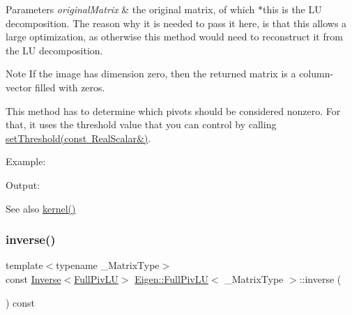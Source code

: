 \begin{DoxyParams}{Parameters}
{\em original\+Matrix} & the original matrix, of which $\ast$this is the LU decomposition. The reason why it is needed to pass it here, is that this allows a large optimization, as otherwise this method would need to reconstruct it from the LU decomposition.\\
\hline
\end{DoxyParams}
\begin{DoxyNote}{Note}
If the image has dimension zero, then the returned matrix is a column-\/vector filled with zeros.

This method has to determine which pivots should be considered nonzero. For that, it uses the threshold value that you can control by calling \mbox{\hyperlink{class_eigen_1_1_full_piv_l_u_a414592d82de98f5bd075965caf56d681}{set\+Threshold(const Real\+Scalar\&)}}.
\end{DoxyNote}
Example\+: 
\begin{DoxyCodeInclude}{0}
\end{DoxyCodeInclude}
 Output\+: 
\begin{DoxyVerbInclude}
\end{DoxyVerbInclude}


\begin{DoxySeeAlso}{See also}
\mbox{\hyperlink{class_eigen_1_1_full_piv_l_u_a70f52eeb2cd07dfbf790fce106fb4015}{kernel()}} 
\end{DoxySeeAlso}
\mbox{\label{class_eigen_1_1_full_piv_l_u_ae6f4bb55f859f6353f99cf15ecff4b25}} 
\subsubsection{\texorpdfstring{inverse()}{inverse()}}
{\footnotesize\ttfamily template$<$typename \+\_\+\+Matrix\+Type$>$ \\
const \mbox{\hyperlink{class_eigen_1_1_inverse}{Inverse}}$<$\mbox{\hyperlink{class_eigen_1_1_full_piv_l_u}{Full\+Piv\+LU}}$>$ \mbox{\hyperlink{class_eigen_1_1_full_piv_l_u}{Eigen\+::\+Full\+Piv\+LU}}$<$ \+\_\+\+Matrix\+Type $>$\+::inverse (\begin{DoxyParamCaption}{ }\end{DoxyParamCaption}) const\hspace{0.3cm}{\ttfamily [inline]}}

